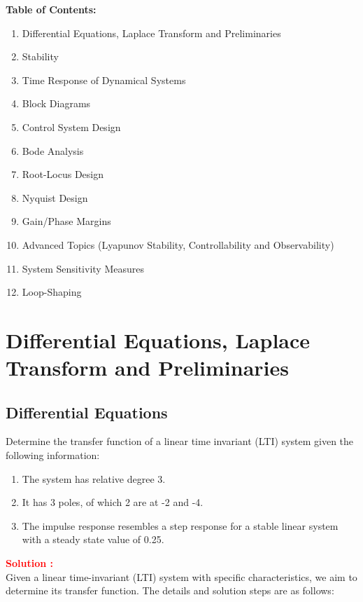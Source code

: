 \documentclass[12pt]{article}
\begin{document}
\textbf{Table of Contents:}
\begin{enumerate}
    \item Differential Equations, Laplace Transform and Preliminaries
    \item Stability
    \item Time Response of Dynamical Systems
    \item Block Diagrams
    \item Control System Design
    \item Bode Analysis
    \item Root-Locus Design
    \item Nyquist Design
    \item Gain/Phase Margins
    \item Advanced Topics (Lyapunov Stability, Controllability and Observability)
    \item System Sensitivity Measures
    \item Loop-Shaping
\end{enumerate}

\clearpage

\section{Differential Equations, Laplace Transform and Preliminaries}
\subsection{Differential Equations}
Determine the transfer function of a linear time invariant (LTI) system given the following information:
\begin{enumerate}
    \item The system has relative degree 3.
    \item It has 3 poles, of which 2 are at -2 and -4.
    \item The impulse response resembles a step response for a stable linear system with a steady state value of 0.25.
\end{enumerate}


\textbf{\textcolor{red}{Solution :}} \\
Given a linear time-invariant (LTI) system with specific characteristics, we aim to determine its transfer function. The details and solution steps are as follows:
\end{document}
